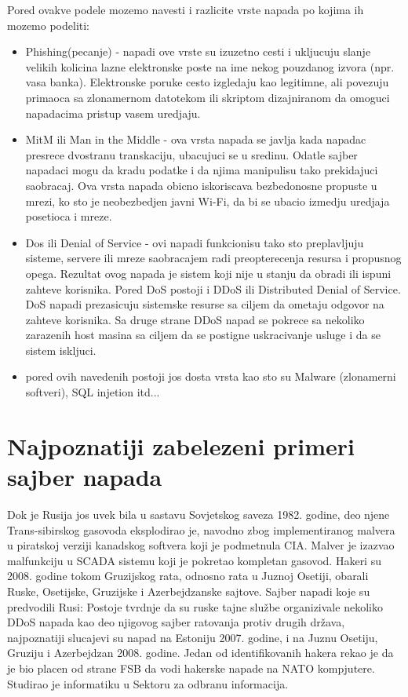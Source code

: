 \documentclass[a4paper]{article}
\begin{document}
{Pored ovakve podele mozemo navesti i razlicite vrste napada po kojima ih mozemo podeliti:
\begin{itemize}
    \item Phishing(pecanje) - napadi ove vrste su izuzetno cesti i ukljucuju slanje velikih kolicina lazne elektronske poste na ime nekog pouzdanog izvora (npr. vasa banka). Elektronske poruke cesto izgledaju kao legitimne, ali povezuju primaoca sa zlonamernom datotekom ili skriptom dizajniranom da omoguci napadacima pristup vasem uredjaju.
    \item MitM ili Man in the Middle - ova vrsta napada se javlja kada napadac presrece dvostranu transkaciju, ubacujuci se u sredinu. Odatle sajber napadaci mogu da kradu podatke i da njima manipulisu tako prekidajuci saobracaj. Ova vrsta napada obicno iskoriscava bezbedonosne propuste u mrezi, ko sto je neobezbedjen javni Wi-Fi, da bi se ubacio izmedju uredjaja posetioca i mreze.
    \item Dos ili Denial of Service - ovi napadi funkcionisu tako sto preplavljuju sisteme, servere ili mreze saobracajem radi preopterecenja resursa i propusnog opega. Rezultat ovog napada je sistem koji nije u stanju da obradi ili ispuni zahteve korisnika.
    Pored DoS postoji i DDoS  ili Distributed Denial of Service. DoS napadi prezasicuju sistemske resurse sa ciljem da ometaju odgovor na zahteve korisnika. Sa druge strane DDoS napad se pokrece sa nekoliko zarazenih host masina sa ciljem da se postigne uskracivanje usluge i da se sistem iskljuci.
    \item pored ovih navedenih postoji jos dosta vrsta kao sto su Malware (zlonamerni softveri), SQL injetion itd...
\end{itemize}



\section{Najpoznatiji zabelezeni primeri sajber napada}
\label{sec:naslovM}


Dok je Rusija jos uvek bila u sastavu Sovjetskog saveza 1982. godine, deo njene Trans-sibirskog gasovoda eksplodirao je, navodno zbog implementiranog malvera u piratskoj verziji kanadskog softvera koji je podmetnula CIA. Malver je izazvao malfunkciju u SCADA sistemu koji je pokretao kompletan gasovod.
Hakeri su 2008. godine tokom Gruzijskog rata, odnosno rata u Juznoj Osetiji, obarali Ruske, Osetijske, Gruzijske i Azerbejdzanske sajtove.
Sajber napadi koje su predvodili Rusi:
Postoje tvrdnje da su ruske tajne službe organizivale nekoliko DDoS napada kao deo njigovog sajber ratovanja protiv drugih država, najpoznatiji slucajevi su napad na Estoniju 2007. godine, i na Juznu Osetiju, Gruziju i Azerbejdzan 2008. godine. Jedan od identifikovanih hakera rekao je da je bio placen od strane FSB da vodi hakerske napade na NATO kompjutere. Studirao je informatiku u Sektoru za odbranu informacija.

}
\end{document}
